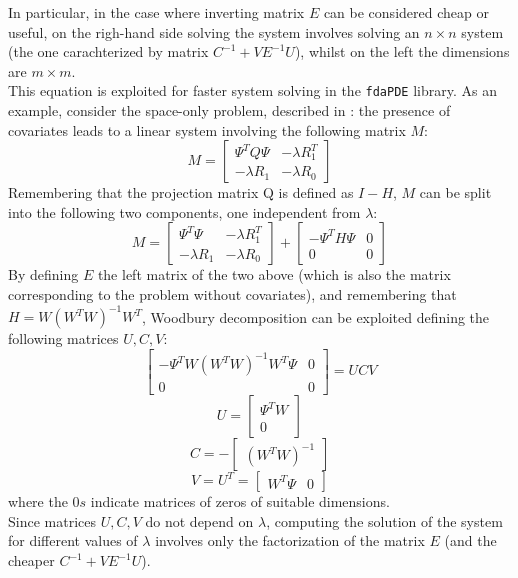 In particular, in the case where inverting matrix $E$ can be considered cheap
or useful, on the righ-hand side solving the system involves solving an
$n\times n$ system (the one carachterized by matrix $C^{-1} + V E^{-1}U$),
whilst on the left the dimensions are $m\times m$.\\ This equation is exploited
for faster system solving in the \verb|fdaPDE| library. As an example, consider
the space-only problem, described \eg in \cite{sangalli1}: the presence of
covariates leads to a linear system involving the following matrix $M$:
\begin{equation*}
	M =
	\begin{bmatrix}
		\Psi^TQ\Psi  & -\lambda R_1^T \\
		-\lambda R_1 & -\lambda R_0
	\end{bmatrix}
\end{equation*} Remembering that the projection matrix Q is defined as $I-H$, $M$
can be split into the following two components, one independent from $\lambda$:
\begin{equation*}
	M =
	\begin{bmatrix}
		\Psi^T\Psi   & -\lambda R_1^T \\
		-\lambda R_1 & -\lambda R_0
	\end{bmatrix}
	+
	\begin{bmatrix}
		-\Psi^TH\Psi & 0 \\
		0            & 0
	\end{bmatrix}
\end{equation*} By defining $E$ the left matrix of the two above (which is also the
matrix corresponding to the problem without covariates), and remembering that
$H = W\left(W^TW\right)^{-1}W^T$, Woodbury decomposition can be exploited
defining the following matrices $U, C, V$:
\begin{equation*}
	\begin{bmatrix}
		-\Psi^TW\left(W^TW\right)^{-1}W^T\Psi & 0 \\
		0                                     & 0
	\end{bmatrix}
	= UCV
\end{equation*}
\begin{equation*}
	U =
	\begin{bmatrix}
		\Psi^TW \\
		0
	\end{bmatrix}
\end{equation*}
\begin{equation*}
	C = -
	\begin{bmatrix}
		\left(W^TW\right)^{-1}
	\end{bmatrix}
\end{equation*}
\begin{equation*}
	V = U^T =
	\begin{bmatrix}
		W^T\Psi & 0
	\end{bmatrix}
\end{equation*} where the $0s$ indicate matrices of zeros of suitable dimensions.\\
Since matrices $U, C, V$ do not depend on $\lambda$, computing the solution of
the system for different values of $\lambda$ involves only the factorization of
the matrix $E$ (and the cheaper $C^{-1} + V E^{-1}U$).